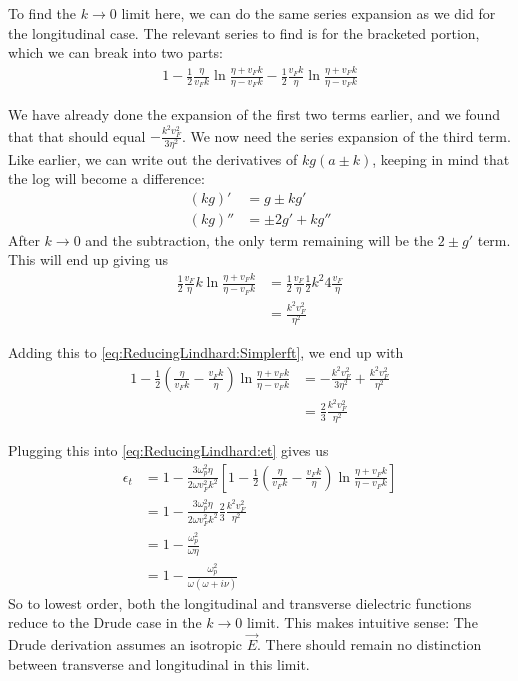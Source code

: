 \documentclass[../../main.tex]{subfiles}
\newcommand{\vf}{v_F}
\begin{document}
To find the $k \rightarrow 0$ limit here, we can do the same series expansion as we did for the longitudinal case. The relevant series to find is for the bracketed portion, which we can break into two parts:
\begin{align} \label{eq:ReducingLindhard:Simplerft}
	 1 - \frac12 \frac{\eta}{\vf k}\ln\frac{\eta + \vf k}{\eta - \vf k} - \frac12 \frac{\vf k}{\eta}\ln\frac{\eta + \vf k}{\eta - \vf k}
\end{align}

We have already done the expansion of the first two terms earlier, and we found that that should equal $- \frac{k^2 \vf^2}{3 \eta^2}$. We now need the series expansion of the third term. Like earlier, we can write out the derivatives of $k g(a \pm k)$, keeping in mind that the log will become a difference:
\begin{align}
	(k g)' &= g \pm k g' \\
	(k g)'' &= \pm 2 g' + k g''
\end{align}
After $k \rightarrow 0$ and the subtraction, the only term remaining will be the $2 \pm g'$ term. This will end up giving us
\begin{align}
	\frac12 \frac{\vf }{\eta} k \ln\frac{\eta + \vf k}{\eta - \vf k} &= \frac12 \frac{\vf}{\eta} \frac12 k^2 4  \frac{\vf}{\eta} \\
	&= \frac{k^2 \vf^2}{\eta^2} 
\end{align}

Adding this to \eqref{eq:ReducingLindhard:Simplerft}, we end up with 
\begin{align}
	1 - \frac12 \left(\frac{\eta}{\vf k} - \frac{\vf k}{\eta} \right)\ln\frac{\eta + \vf k}{\eta - \vf k} &= - \frac{k^2 \vf^2}{3 \eta^2} + \frac{k^2 \vf^2}{\eta^2} \\
	&= \frac23 \frac{k^2 \vf^2}{\eta^2}
\end{align}

Plugging this into \eqref{eq:ReducingLindhard:et} gives us
\begin{align}
	\epsilon_t &= 1 - \frac{3 \omega_p^2 \eta}{2\omega \vf^2 k^2} \left[ 1 - \frac12 \left(\frac{\eta}{\vf k} - \frac{\vf k}{\eta} \right)\ln\frac{\eta + \vf k}{\eta - \vf k} \right] \\
	&= 1 - \frac{3 \omega_p^2 \eta}{2\omega \vf^2 k^2} \frac23 \frac{k^2 \vf^2}{\eta^2} \\
	&= 1 - \frac{\omega_p^2}{\omega \eta}\\
	&= 1 - \frac{\omega_p^2}{\omega \left(\omega + i \nu \right) }
\end{align}
So to lowest order, both the longitudinal and transverse dielectric functions reduce to the Drude case in the $k \rightarrow 0$ limit. This makes intuitive sense: The Drude derivation assumes an isotropic $\vec{E}$. There should remain no distinction between transverse and longitudinal in this limit.
\end{document}

